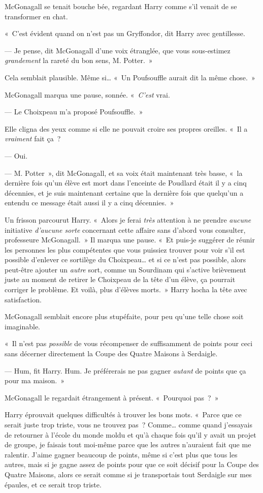 McGonagall se tenait bouche bée, regardant Harry comme s'il venait de se transformer en chat.

«~C'est évident quand on n'est pas un Gryffondor, dit Harry avec gentillesse.

--- Je pense, dit McGonagall d'une voix étranglée, que vous sous-estimez \emph{grandement} la rareté du bon sens, M. Potter.~»

Cela semblait plausible. Même si… «~Un Poufsouffle aurait dit la même chose.~»

McGonagall marqua une pause, sonnée.
«~\emph{C'est} vrai.

--- Le Choixpeau m'a proposé Poufsouffle.~»

Elle cligna des yeux comme si elle ne pouvait croire ses propres oreilles.
«~Il a \emph{vraiment} fait ça~?

--- Oui.


--- M. Potter~», dit McGonagall, et sa voix était maintenant très basse,
«~la dernière fois qu'un élève est mort dans l'enceinte de Poudlard était il y a cinq décennies,
et je suis maintenant certaine que la dernière fois que quelqu'un a entendu ce message était aussi il y a cinq décennies.~»

Un frisson parcourut Harry.
«~Alors je ferai \emph{très} attention à ne prendre \emph{aucune} initiative \emph{d'aucune sorte} concernant cette affaire sans d'abord vous consulter, professeure McGonagall.~»
Il marqua une pause.
«~Et puis-je suggérer de réunir les personnes les plus compétentes que vous puissiez trouver pour voir s'il est possible d'enlever ce sortilège du Choixpeau… et si ce n'est pas possible, alors peut-être ajouter un \emph{autre} sort, comme un Sourdinam qui s'active brièvement juste au moment de retirer le Choixpeau de la tête d'un élève, ça pourrait corriger le problème.
Et voilà, plus d'élèves morts.~»
Harry hocha la tête avec satisfaction.

McGonagall semblait encore plus stupéfaite, pour peu qu'une telle chose soit imaginable.

«~Il n'est pas \emph{possible} de vous récompenser de suffisamment de points pour ceci sans décerner directement la Coupe des Quatre Maisons à Serdaigle.

--- Hum, fit Harry. Hum. Je préférerais ne pas gagner \emph{autant} de points que ça pour ma maison.~»

McGonagall le regardait étrangement à présent. «~Pourquoi pas~?~»

Harry éprouvait quelques difficultés à trouver les bons mots.
«~Parce que ce serait juste trop triste, vous ne trouvez pas~? Comme… comme quand j'essayais de retourner à l'école du monde moldu et qu'à chaque fois qu'il y avait un projet de groupe, je faisais tout moi-même parce que les autres n'auraient fait que me ralentir.
J'aime gagner beaucoup de points, même si c'est plus que tous les autres, mais si je gagne assez de points pour que ce soit décisif pour la Coupe des Quatre Maisons, alors ce serait comme si je transportais tout Serdaigle sur mes épaules, et ce serait trop triste.

